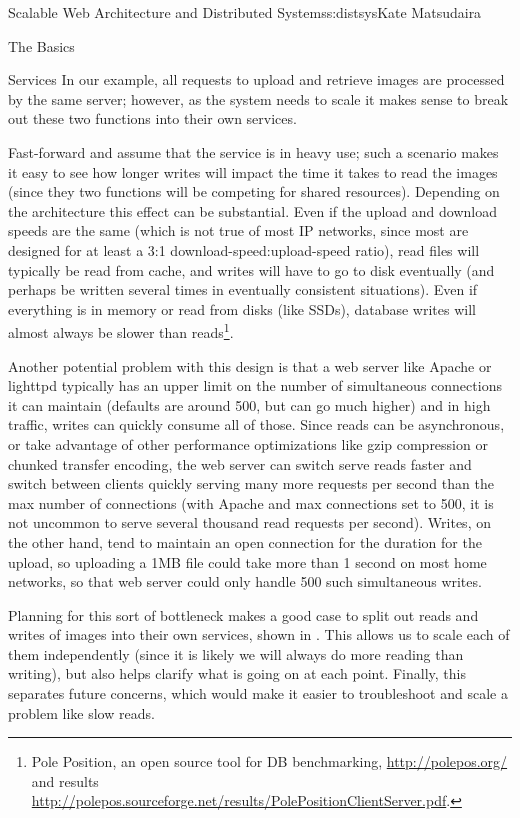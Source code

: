 \begin{aosachapter}{Scalable Web Architecture and Distributed Systems}{s:distsys}{Kate Matsudaira}
\begin{aosasect1}{The Basics}
\begin{aosasect2}{Services}
In our example, all requests to upload and retrieve images are
processed by the same server; however, as the system needs to
scale it makes sense to break out these two functions into
their own services.

Fast-forward and assume that the service is in heavy use; such a
scenario makes it easy to see how longer writes will impact the time it takes
to read the images (since they two functions will be competing for
shared resources). Depending on the architecture this effect can be
substantial. Even if the upload and download speeds are the same
(which is not true of most IP networks, since most are designed for at
least a 3:1 download-speed:upload-speed ratio), read files will typically be read
from cache, and writes will have to go to disk eventually (and perhaps
be written several times in eventually consistent situations).
Even if everything is in memory or read from disks (like SSDs),
database writes will almost always be slower than reads\footnote{Pole
  Position, an open source tool for DB benchmarking,
  \url{http://polepos.org/} and results
  \url{http://polepos.sourceforge.net/results/PolePositionClientServer.pdf}.}.

Another potential problem with this design is that a web server like
Apache or lighttpd typically has an upper limit on the number of
simultaneous connections it can maintain
(defaults are around 500, but can go much higher) and in
high traffic, writes can quickly consume all of those. Since reads can
be asynchronous, or take advantage of other performance optimizations
like gzip compression or chunked transfer encoding, the web server can
switch serve reads faster and switch between clients quickly serving
many more requests per second than the max number of connections (with
Apache and max connections set to 500, it is not uncommon to serve
several thousand read requests per second). Writes, on the other hand,
tend to maintain an open connection for the duration for the upload,
so uploading a 1MB file could take more than 1 second on most home networks,
so that web server could only handle 500 such simultaneous
writes.


Planning for this sort of bottleneck makes a good case
to split out reads and writes of images into their own
services, shown in . This allows us to scale each of them independently (since it
is likely we will always do more reading than writing), but also helps
clarify what is going on at each point. Finally, this separates future
concerns, which would make it easier to troubleshoot and scale a
problem like slow reads.


\end{aosasect2}
\end{aosasect1}
\end{aosachapter}
